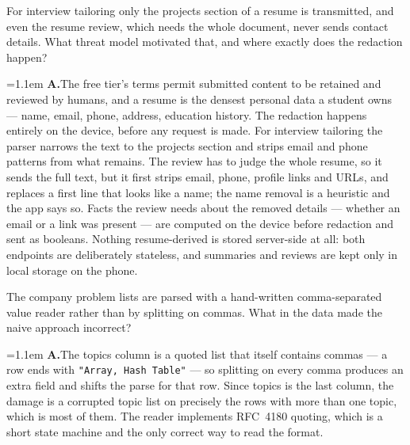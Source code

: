 \documentclass[11pt,a4paper]{article}
\newcommand{\code}[1]{\texttt{\small #1}}
\newcommand{\ans}[1]{%
  \par\vspace{0.32em}%
  \begingroup
  \small\color{answerink}%
  \leftskip=1.1em
  \noindent\textbf{\color{accent}A.}\hspace{0.45em}#1\par
  \endgroup
  \vspace{0.1em}%
}
\begin{document}
\begin{questions}[resume]
\item For interview tailoring only the projects section of a resume is
transmitted, and even the resume review, which needs the whole document, never
sends contact details. What threat model motivated that, and where exactly does
the redaction happen?
\ans{The free tier's terms permit submitted content to be retained and reviewed by
humans, and a resume is the densest personal data a student owns --- name, email,
phone, address, education history. The redaction happens entirely on the device,
before any request is made. For interview tailoring the parser narrows the text to
the projects section and strips email and phone patterns from what remains. The
review has to judge the whole resume, so it sends the full text, but it first
strips email, phone, profile links and URLs, and replaces a first line that looks
like a name; the name removal is a heuristic and the app says so. Facts the
review needs about the removed details --- whether an email or a link was present
--- are computed on the device before redaction and sent as booleans. Nothing
resume-derived is stored server-side at all: both endpoints are deliberately
stateless, and summaries and reviews are kept only in local storage on the phone.}

\item The company problem lists are parsed with a hand-written comma-separated
value reader rather than by splitting on commas. What in the data made the naive
approach incorrect?
\ans{The topics column is a quoted list that itself contains commas --- a row ends
with \code{"Array, Hash Table"} --- so splitting on every comma produces an extra
field and shifts the parse for that row. Since topics is the last column, the
damage is a corrupted topic list on precisely the rows with more than one topic,
which is most of them. The reader implements RFC~4180 quoting, which is a short
state machine and the only correct way to read the format.}

\end{questions}
\end{document}
